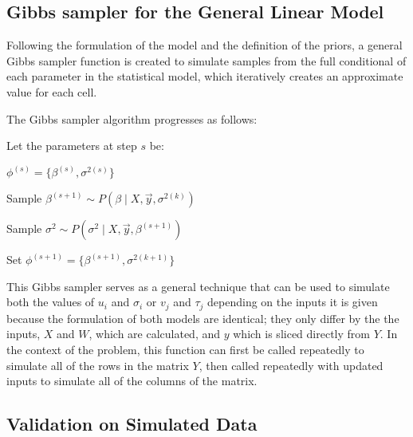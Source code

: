 \documentclass[12pt,twoside]{dukestatscithesis}
\theoremstyle{definition}
\theoremstyle{definition}
\theoremstyle{definition}
\theoremstyle{remark}
\begin{document}
\subsection{Gibbs sampler for the General Linear
Model}\label{gibbs-sampler-for-the-general-linear-model}

Following the formulation of the model and the definition of the priors,
a general Gibbs sampler function is created to simulate samples from the
full conditional of each parameter in the statistical model, which
iteratively creates an approximate value for each cell.

The Gibbs sampler algorithm progresses as follows:

Let the parameters at step \(s\) be:

\(\phi^{(s)} = \{\beta^{(s)}, \sigma^{2(s)}\}\)

Sample \(\beta^{(s+1)} \sim P(\beta \mid X, \vec{y}, \sigma^{2(k)})\)

Sample \(\sigma^2 \sim P(\sigma^2 \mid X, \vec{y}, \beta^{(s+1)})\)

Set \(\phi^{(s+1)} = \{\beta^{(s+1)}, \sigma^{2(k+1)}\}\)

This Gibbs sampler serves as a general technique that can be used to
simulate both the values of \(u_i\) and \(\sigma_i\) or \(v_j\) and
\(\tau_j\) depending on the inputs it is given because the formulation
of both models are identical; they only differ by the the inputs, \(X\)
and \(W\), which are calculated, and \(y\) which is sliced directly from
\(Y\). In the context of the problem, this function can first be called
repeatedly to simulate all of the rows in the matrix \(Y\), then called
repeatedly with updated inputs to simulate all of the columns of the
matrix.

\subsection{Validation on Simulated
Data}\label{validation-on-simulated-data}
\end{document}
